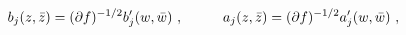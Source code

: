 \begin{equation}\label{2.7a}
b_j(z,\bar{z})=(\partial f)^{-1/2}
b'_j(w,\bar{w})~,\hskip 1cm a_j(z,\bar{z})=(\partial f)^{-1/2}
a'_j(w,\bar{w})~,
\end{equation}

